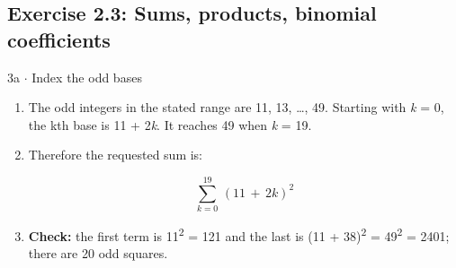 \documentclass[11pt]{article}
\begin{document}
\begin{keepsection}\subsection{Exercise 2.3: Sums, products, binomial coefficients}

\begin{workedbox}{3a \ensuremath{\cdot} Index the odd bases}
\begin{enumerate}
\item The odd integers in the stated range are 11, 13, …, 49. Starting with \textit{k} = 0, the kth base is 11 + 2\textit{k}. It reaches 49 when \textit{k} = 19.
\item {}
Therefore the requested sum is:

\begin{equation*}\sum_{{k}=0}^{19} \, (11\, +\, 2{k})^{2}\end{equation*}
\item \textbf{Check:} the first term is 11\textsuperscript{2} = 121 and the last is (11 + 38)\textsuperscript{2} = 49\textsuperscript{2} = 2401; there are 20 odd squares.
\end{enumerate}
\end{workedbox}

\end{keepsection}
\end{document}
